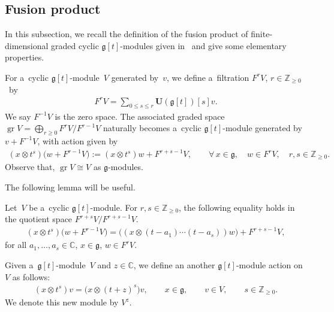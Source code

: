 \documentclass[pdftex]{sigma}
\DeclareMathOperator{\gr}{gr}
\numberwithin{equation}{section}
\begin{document}
\subsection{Fusion product}\label{section3.3}

In this subsection, we recall the def\/inition of the fusion product of f\/inite-dimensional graded cyclic
$\mathfrak{g}[t]$-modules given in~\cite{FL} and give some elementary properties.

For a~cyclic $\mathfrak{g}[t]$-module~$V$ generated by~$v$, we def\/ine a~f\/iltration $F^{r}V$, $r\in\mathbb{Z}_{\geq 0}$~by
\begin{gather*}
F^{r}V=\sum\limits_{0\leq s \leq r} \mathbf{U}(\mathfrak{g}[t])[s] v.
\end{gather*}
We say $F^{-1}V$ is the zero space.
The associated graded space $\gr V=\bigoplus_{r\geq 0} F^{r}V/ F^{r-1}V $ naturally becomes a~cyclic
$\mathfrak{g}[t]$-module generated by $v+F^{-1}V$, with action given by
\begin{gather*}
(x\otimes t^s)\big(w+F^{r-1}V\big):= (x\otimes t^s)w+F^{r+s-1}V,
\qquad
\forall\,
x\in \mathfrak{g},
\quad
w\in F^{r}V, \quad
r, s\in \mathbb{Z}_{\geq0}.
\end{gather*}
Observe that, $\gr V \cong V$ as $\mathfrak{g}$-modules.

The following lemma will be useful.
\begin{lemma}
\label{f1}
Let~$V$ be a~cyclic $\mathfrak{g}[t]$-module.
For $r,s\in \mathbb{Z}_{\geq0}$, the following equality holds in the quotient space $F^{r+s}V/ F^{r+s-1}V$.
\begin{gather*}
(x\otimes t^s)\big(w+F^{r-1}V\big)=\big((x\otimes (t-a_1)\cdots (t-a_s))w\big) + F^{r+s-1}V,
\end{gather*}
for all $a_1,\dots,a_s\in\mathbb{C}$,
$x\in \mathfrak{g}$, $w\in F^{r}V$.
\end{lemma}

Given a~$\mathfrak{g}[t]$-module~$V$ and $z\in\mathbb{C}$, we def\/ine an another $\mathfrak{g}[t]$-module action on~$V$
as follows:
\begin{gather*}
(x\otimes t^s)v=\big(x\otimes (t+z)^s\big)v,
\qquad
x\in\mathfrak{g},
\qquad
v\in V,
\qquad
s\in \mathbb{Z}_{\geq0}.
\end{gather*}
We denote this new module by $V^z$.
\end{document}
